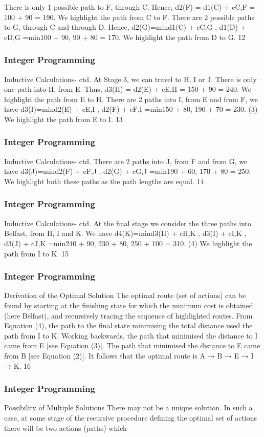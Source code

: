 \begin{frame}
There is only 1 possible path to F, through C. Hence,
d2(F) = d1(C) + cC,F = 100 + 90 = 190.
We highlight the path from C to F.
There are 2 possible paths to G, through C and through D. Hence,
d2(G)=min{d1(C) + cC,G , d1(D) + cD,G }
=min{100 + 90, 90 + 80} = 170.
We highlight the path from D to G.
12 \end{frame}  \begin{frame} \frametitle{Integer Programming}     
Inductive Calculations- ctd.
At Stage 3, we can travel to H, I or J. There is only one path into
H, from E. Thus,
d3(H) = d2(E) + cE,H = 150 + 90 = 240.
We highlight the path from E to H.
There are 2 paths into I, from E and from F, we have
d3(I)=min{d2(E) + cE,I
, d2(F) + cF,I }
=min{150 + 80, 190 + 70} = 230. (3)
We highlight the path from E to I.
13 \end{frame}  \begin{frame} \frametitle{Integer Programming}     
Inductive Calculations- ctd.
There are 2 paths into J, from F and from G, we have
d3(J)=min{d2(F) + cF,J , d2(G) + cG,J }
=min{190 + 60, 170 + 80} = 250.
We highlight both these paths as the path lengths are equal.
14 \end{frame}  \begin{frame} \frametitle{Integer Programming}     
Inductive Calculations- ctd.
At the final stage we consider the three paths into Belfast, from
H, I and K. We have
d4(K)=min{d3(H) + cH,K , d3(I) + cI,K , d3(J) + cJ,K }
=min{240 + 90, 230 + 80, 250 + 100} = 310. (4)
We highlight the path from I to K.
15 \end{frame}  \begin{frame} \frametitle{Integer Programming}     
Derivation of the Optimal Solution
The optimal route (set of actions) can be found by starting at the
finishing state for which the minimum cost is obtained (here
Belfast), and recursively tracing the sequence of highlighted routes.
From Equation (4), the path to the final state minimising the total
distance used the path from I to K.
Working backwards, the path that minimised the distance to I
came from E [see Equation (3)]. The path that minimised the
distance to E came from B [see Equation (2)]. It follows that the
optimal route is A → B → E → I → K.
16 \end{frame}  \begin{frame} \frametitle{Integer Programming}     
Possibility of Multiple Solutions
There may not be a unique solution.
In such a case, at some stage of the recursive procedure defining
the optimal set of actions there will be two actions (paths) which

\end{frame}
